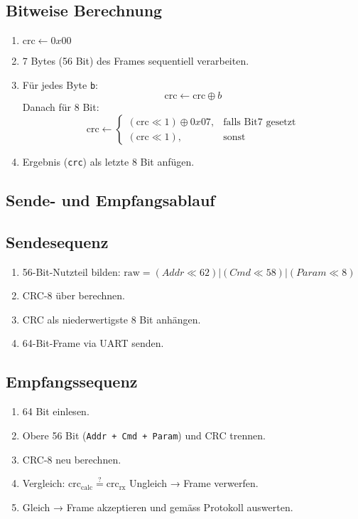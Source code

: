 \documentclass[main.tex]{subfiles} %
\begin{document}
\subsection*{Bitweise Berechnung}
\begin{enumerate}
  \item \(\text{crc} \gets 0x00\)
  \item 7 Bytes (56 Bit) des Frames sequentiell verarbeiten.
  \item Für jedes Byte \texttt{b}:
        \[
          \text{crc} \gets \text{crc} \oplus b
        \]
        Danach für 8 Bit:
        \[
          \text{crc} \gets
          \begin{cases}
            (\text{crc}\ll1) \oplus 0x07, & \text{falls Bit7 gesetzt} \\
            (\text{crc}\ll1),             & \text{sonst}
          \end{cases}
        \]
  \item Ergebnis (\texttt{crc}) als letzte 8 Bit anfügen.
\end{enumerate}

\subsection*{Sende- und Empfangsablauf}

\subsection*{Sendesequenz}
\begin{enumerate}
  \item 56-Bit-Nutzteil bilden:
        \(\text{raw} = (Addr\ll62) | (Cmd\ll58) | (Param\ll8)\)
  \item CRC-8 über  berechnen.
  \item CRC als niederwertigste 8 Bit anhängen.
  \item 64-Bit-Frame via UART senden.
\end{enumerate}

\subsection*{Empfangssequenz}
\begin{enumerate}
  \item 64 Bit einlesen.
  \item Obere 56 Bit (\texttt{Addr + Cmd + Param}) und CRC trennen.
  \item CRC-8 neu berechnen.
  \item Vergleich: \(\text{crc}_{\text{calc}} \stackrel{?}{=} \text{crc}_{\text{rx}}\)
        Ungleich → Frame verwerfen.
  \item Gleich → Frame akzeptieren und gemäss Protokoll auswerten.
\end{enumerate}
\end{document}
